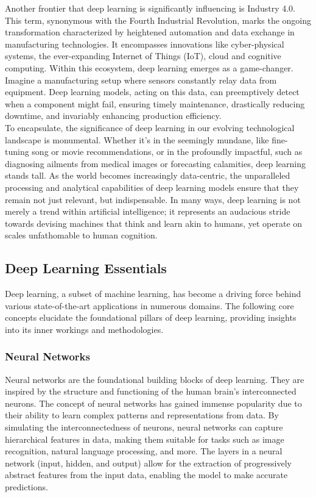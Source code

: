 Another frontier that deep learning is significantly influencing is Industry 4.0. 
This term, synonymous with the Fourth Industrial Revolution, marks the ongoing 
transformation characterized by heightened automation and data exchange in manufacturing 
technologies. It encompasses innovations like cyber-physical systems, the ever-expanding 
Internet of Things (IoT), cloud and cognitive computing. Within this ecosystem, deep learning 
emerges as a game-changer. Imagine a manufacturing setup where sensors constantly relay data 
from equipment. Deep learning models, acting on this data, can preemptively detect when a 
component might fail, ensuring timely maintenance, drastically reducing downtime, and 
invariably enhancing production efficiency.\\

To encapsulate, the significance of deep learning in our evolving technological 
landscape is monumental. Whether it's in the seemingly mundane, like fine-tuning 
song or movie recommendations, or in the profoundly impactful, such as diagnosing 
ailments from medical images or forecasting calamities, deep learning stands tall. 
As the world becomes increasingly data-centric, the unparalleled processing and analytical 
capabilities of deep learning models ensure that they remain not just relevant, but 
indispensable. In many ways, deep learning is not merely a trend within artificial 
intelligence; it represents an audacious stride towards devising machines that think and 
learn akin to humans, yet operate on scales unfathomable to human cognition.\\

\subsection{Deep Learning Essentials}

Deep learning, a subset of machine learning, has become a driving force behind various state-of-the-art applications in numerous domains. The following core concepts elucidate the foundational pillars of deep learning, providing insights into its inner workings and methodologies.

\subsubsection*{Neural Networks}

Neural networks are the foundational building blocks of deep learning. They are inspired by the structure and functioning of the human brain's interconnected neurons. The concept of neural networks has gained immense popularity due to their ability to learn complex patterns and representations from data. By simulating the interconnectedness of neurons, neural networks can capture hierarchical features in data, making them suitable for tasks such as image recognition, natural language processing, and more. The layers in a neural network (input, hidden, and output) allow for the extraction of progressively abstract features from the input data, enabling the model to make accurate predictions.

